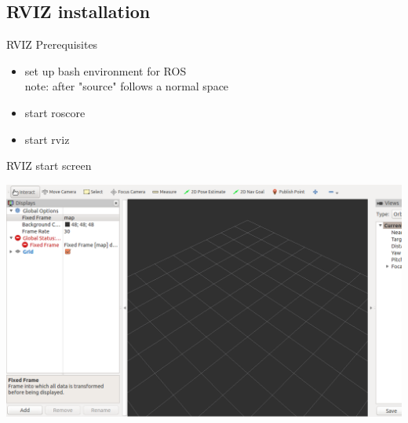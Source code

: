 \documentclass{beamer}
\begin{document}
\subsection{RVIZ installation}
\begin{frame}[fragile]{RVIZ Prerequisites}	

	\begin{itemize}
		\item set up bash environment for ROS \\

			
			note: after "source" follows a normal space	
		
		
		\item start roscore \\
			
			
			
		\item start rviz \\
			
		
	\end{itemize}

\end{frame}





\begin{frame}{RVIZ start screen}	

	\includegraphics[width=\textwidth]{./images/RVIZ_Start_Screen.png}

\end{frame}
\end{document}
